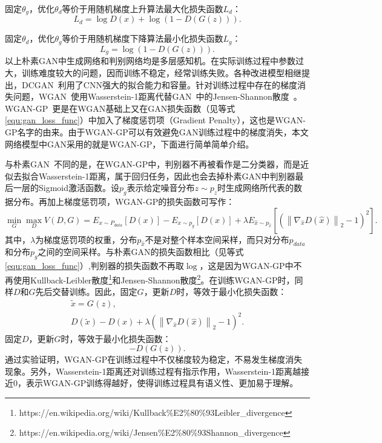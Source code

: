 \noindent 固定$\theta_{g}$，优化$\theta_{d}$等价于用随机梯度上升算法最大化损失函数$L_d$：
\begin{equation*}
L_d=\log D\left(x\right)+\log \left(1-D\left(G\left(z\right)\right)\right).
\end{equation*}

\noindent 固定$\theta_{d}$，优化$\theta_{g}$等价于用随机梯度下降算法最小化损失函数$L_g$：
\begin{equation*}
L_g=\log \left(1-D\left(G\left(z\right)\right)\right).
\end{equation*}
\noindent 以上朴素GAN中生成网络和判别网络均是多层感知机。在实际训练过程中参数过大，训练难度较大的问题，因而训练不稳定，经常训练失败。各种改进模型相继提出，DCGAN~\cite{radford2015unsupervised}利用了CNN强大的拟合能力和容量。针对训练过程中存在的梯度消失问题，WGAN~\cite{gulrajani2017improved}使用Wasserstein-1距离代替GAN~\cite{goodfellow2014generative}中的Jensen-Shannon散度~\cite{arjovsky2017towards}。WGAN-GP~\cite{gulrajani2017improved}更是在WGAN基础上又在GAN损失函数（见等式\ref{equ:gan_loss_func}）中加入了梯度惩罚项（Gradient Penalty），这也是WGAN-GP名字的由来。由于WGAN-GP可以有效避免GAN训练过程中的梯度消失，本文网络模型中GAN采用的就是WGAN-GP，下面进行简单简单介绍。

与朴素GAN~\cite{goodfellow2014generative}不同的是，在WGAN-GP中，判别器不再被看作是二分类器，而是近似去拟合Wasserstein-1距离，属于回归任务，因此也会去掉朴素GAN中判别器最后一层的Sigmoid激活函数。设$p_g$表示给定噪音分布$z\sim p_z$时生成网络所代表的数据分布。再加上梯度惩罚项，WGAN-GP的损失函数可写作：
\begin{equation}\label{wgan_gp_loss_func}
\min _{G} \max _{D} V(D, G)=E_{x \sim P_{d a t a}}[D(x)]-E_{x \sim p_{g}}[D(x)]+\lambda E_{\hat{x} \sim p_{\hat{x}}}\left[\left(\left\|\nabla_{\hat{x}} D(\hat{x})\right\|_{2}-1\right)^{2}\right].
\end{equation}
其中，$\lambda$为梯度惩罚项的权重，分布$p_{\hat{x}}$不是对整个样本空间采样，而只对分布$p_{data}$和分布$p_{g}$之间的空间采样。与朴素GAN的损失函数相比（见等式\ref{equ:gan_loss_func}）,判别器的损失函数不再取$\log$，这是因为WGAN-GP中不再使用Kullback-Leibler散度\footnote{https://en.wikipedia.org/wiki/Kullback\%E2\%80\%93Leibler\_divergence}和Jensen-Shannon散度\footnote{https://en.wikipedia.org/wiki/Jensen\%E2\%80\%93Shannon\_divergence}。在训练WGAN-GP时，同样$D$和$G$先后交替训练。因此，固定$G$，更新$D$时，等效于最小化损失函数：
\begin{gather*}
\tilde{{x}} = G_{}({z}), \\
D(\tilde{{x}})-D({x})+\lambda\left(\left\|\nabla_{\hat{x}} D(\hat{x})\right\|_{2}-1\right)^{2}.
\end{gather*}
\noindent 固定$D$，更新$G$时，等效于最小化损失函数：
\begin{equation*}
-D\left(G(z)\right).
\end{equation*}
通过实验证明，WGAN-GP在训练过程中不仅梯度较为稳定，不易发生梯度消失现象。另外，Wasserstein-1距离还对训练过程有指示作用，Wasserstein-1距离越接近0，表示WGAN-GP训练得越好，使得训练过程具有语义性、更加易于理解。
